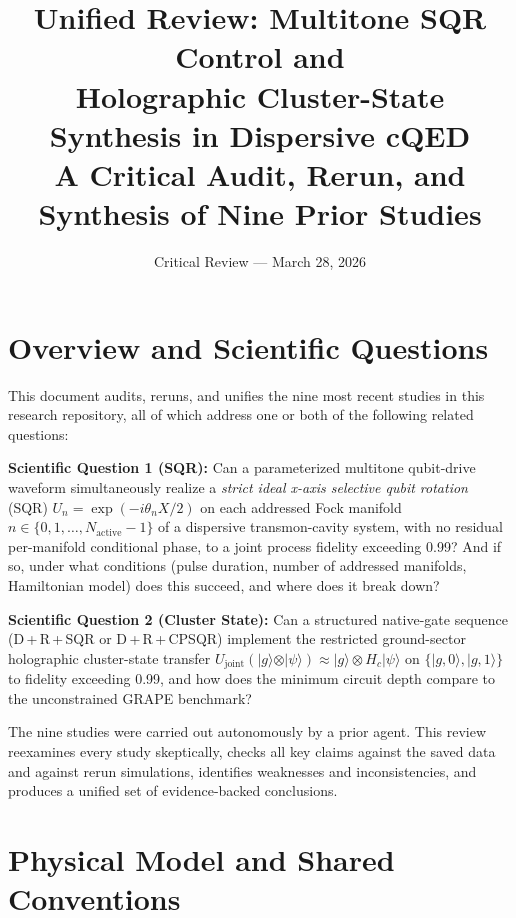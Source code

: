\documentclass[11pt,letterpaper]{article}
\title{\textbf{Unified Review: Multitone SQR Control and\\
Holographic Cluster-State Synthesis in Dispersive cQED}\\[0.5em]
\large A Critical Audit, Rerun, and Synthesis of Nine Prior Studies}
\author{Critical Review --- March 28, 2026}
\date{}
\newcommand{\nact}{N_{\text{active}}}
\begin{document}
\maketitle
\tableofcontents
\clearpage

\section{Overview and Scientific Questions}

This document audits, reruns, and unifies the nine most recent studies in this research
repository, all of which address one or both of the following related questions:

\begin{mdframed}
\textbf{Scientific Question 1 (SQR):}
Can a parameterized multitone qubit-drive waveform simultaneously realize
a \emph{strict ideal x-axis selective qubit rotation} (SQR)
$U_n = \exp(-i\theta_n X / 2)$
on each addressed Fock manifold $n \in \{0, 1, \ldots, \nact{-}1\}$
of a dispersive transmon-cavity system,
with no residual per-manifold conditional phase,
to a joint process fidelity exceeding 0.99?
And if so, under what conditions (pulse duration, number of addressed manifolds,
Hamiltonian model) does this succeed, and where does it break down?

\textbf{Scientific Question 2 (Cluster State):}
Can a structured native-gate sequence (D\,+\,R\,+\,SQR or D\,+\,R\,+\,CPSQR)
implement the restricted ground-sector holographic cluster-state transfer
$U_\text{joint}(\vert g\rangle \otimes \vert\psi\rangle) \approx \vert g\rangle \otimes H_c\vert\psi\rangle$
on $\{\vert g,0\rangle, \vert g,1\rangle\}$ to fidelity exceeding 0.99,
and how does the minimum circuit depth compare to the unconstrained GRAPE benchmark?
\end{mdframed}

The nine studies were carried out autonomously by a prior agent.
This review reexamines every study skeptically, checks all key claims against the
saved data and against rerun simulations, identifies weaknesses and inconsistencies,
and produces a unified set of evidence-backed conclusions.

\section{Physical Model and Shared Conventions}
\end{document}
